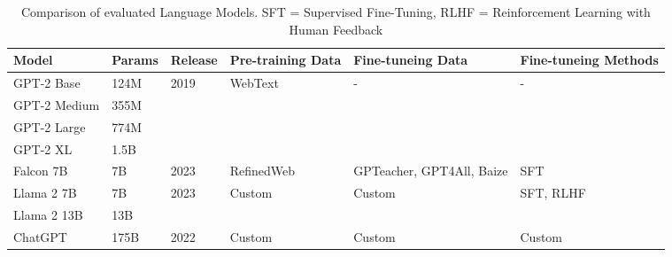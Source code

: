 \begin{table}[tb]
\centering
\begin{tabularx}{\textwidth}{lllXXX}
\hline
\textbf{Model} & \textbf{Params} & \textbf{Release} & \textbf{Pre-training Data} & \textbf{Fine-tuneing Data} & \textbf{Fine-tuneing Methods} \\
\hline
GPT-2 Base    & 124M & \multirow{4}{*}{2019} & \multirow{4}{*}{WebText} & \multirow{4}{*}{-} & \multirow{4}{*}{-} \\
GPT-2 Medium  & 355M &                      &                          &  &  \\
GPT-2 Large   & 774M &                      &                          &  &  \\
GPT-2 XL      & 1.5B &                      &                          &  &  \\
\hline
Falcon 7B              & 7B      & 2023 & RefinedWeb           & GPTeacher, GPT4All, Baize & SFT \\
\hline
Llama 2 7B & 7B    & \multirow{2}{*}{2023} & \multirow{2}{*}{Custom} & \multirow{2}{*}{Custom} & \multirow{2}{*}{SFT, RLHF} \\
Llama 2 13B   & 13B   &  &                        &                         &  \\
\hline
ChatGPT                & 175B   & 2022 & Custom                & Custom & Custom \\
\hline
\end{tabularx}
\caption{Comparison of evaluated Language Models. SFT = Supervised Fine-Tuning, RLHF = Reinforcement Learning with Human Feedback}\label{tab:language-models}
\end{table}

